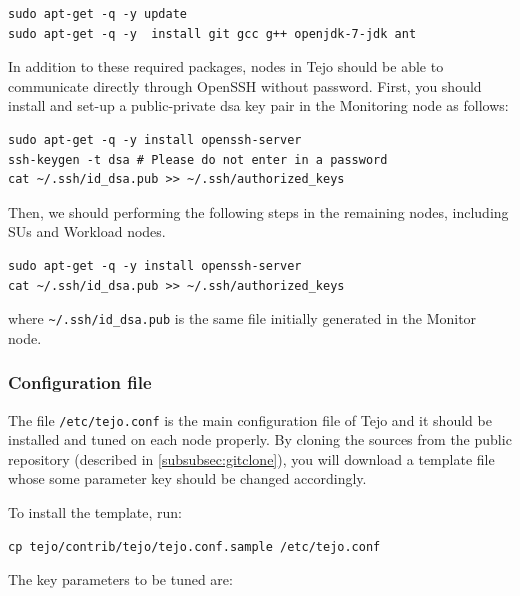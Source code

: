 \begin{lstlisting}
sudo apt-get -q -y update 
sudo apt-get -q -y  install git gcc g++ openjdk-7-jdk ant
\end{lstlisting}

In addition to these required packages, nodes in Tejo should be able to communicate directly through OpenSSH without password. First, you should install and set-up a public-private dsa key pair in the Monitoring node as follows:

\begin{lstlisting}
sudo apt-get -q -y install openssh-server
ssh-keygen -t dsa # Please do not enter in a password
cat ~/.ssh/id_dsa.pub >> ~/.ssh/authorized_keys
\end{lstlisting}

Then, we should performing the following steps in the remaining nodes, including SUs and Workload nodes.

\begin{lstlisting}
sudo apt-get -q -y install openssh-server
cat ~/.ssh/id_dsa.pub >> ~/.ssh/authorized_keys
\end{lstlisting}
where \verb|~/.ssh/id_dsa.pub| is the same file initially generated in the Monitor node.
 
\subsubsection{Configuration file}

The file \verb|/etc/tejo.conf| is the main configuration file of Tejo and it should be installed and tuned on each node properly. By cloning the sources from the public repository (described in \ref{subsubsec:gitclone}), you will download a template file whose some parameter key should be changed accordingly.

To install the template, run:
\begin{lstlisting}
cp tejo/contrib/tejo/tejo.conf.sample /etc/tejo.conf
\end{lstlisting}

The key parameters to be tuned are:

